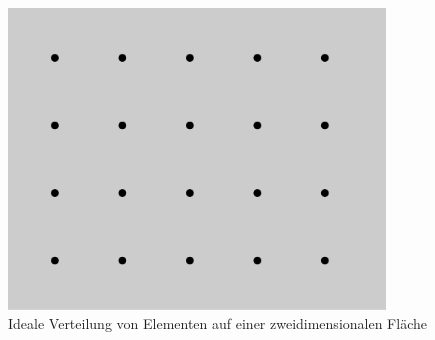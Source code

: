 \begin{figure}[H]
\begin{center}
\includegraphics[width=100mm]{images/ch6_img03_ideal2d.png}
\caption{Ideale Verteilung von Elementen auf einer zweidimensionalen Fläche}
\label{img:ch6_img03_ideal2d}
\end{center}
\end{figure}

